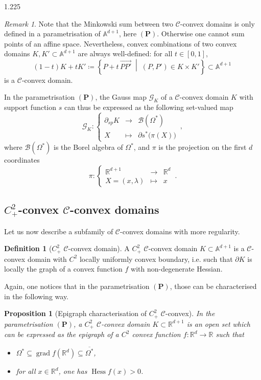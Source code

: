 \documentclass[reqno, a4paper]{amsart}
\numberwithin{equation}{section}
\numberwithin{figure}{section}
\newtheorem{proposition}[theorem]{Proposition}
\theoremstyle{definition}
\newtheorem{definition}[theorem]{Definition}
\theoremstyle{remark}
\newtheorem{remark}[theorem]{Remark}
\newcommand{\R}{\mathbb{R}} %
\newcommand{\A}{\mathbb{A}} %
\DeclareMathOperator{\grad}{grad} %
\DeclareMathOperator{\Hess}{Hess} %
\newcommand{\C}{\mathcal{C}} %
\newcommand{\G}{\mathcal{G}} %
\newcommand{\st}{\; \middle\vert \;} %
\newcommand{\namelessfunction}[4]{ \left\lbrace \begin{matrix}
{#1} &\longrightarrow& {#2}\\
{#3} & \longmapsto & {#4}
\end{matrix} \right. }
\newcommand{\function}[5]{{#1}: \namelessfunction{#2}{#3}{#4}{#5}}
\newcommand{\bp}[1]{{\bigl( {#1} \bigr)}} %
\begin{document}
\begin{spacing}{1.225}
\begin{remark}
\label{rem convex combination}
Note that the Minkowski sum between two $\C$-convex domains is only defined in a parametrisation of $\A^{d+1}$, here $(\mathbf{P})$. Otherwise one cannot sum points of an affine space. Nevertheless, convex combinations of two convex domains $K,K' \subset \A^{d+1}$ are always well-defined: for all $t\in [0,1]$,
\begin{equation*}
 (1-t)K+tK'\coloneqq \left\lbrace P+t \, \overrightarrow{PP'} \st (P,P')\in K\times K' \right\rbrace \subset \A^{d+1} \, 
\end{equation*}
is a $\C$-convex domain.
\end{remark}

In the parametrisation $(\mathbf{P})$, the Gauss map $\G_K$ of a $\C$-convex domain $K$ with support function $s$ can thus be expressed as the following set-valued map
\begin{equation*}
\label{eq gauss map def}
\function{\G_{K}}{\partial_{sp} K}{\mathcal{B}(\Omega^*)}{X}{\partial s^*\bp{\pi(X)}} \, ,
\end{equation*}
where $\mathcal{B}(\Omega^*)$ is the Borel algebra of $\Omega^*$, and $\pi$ is the projection on the first $d$ coordinates
\begin{equation*}
 \function{\pi}{\R^{d+1}}{\R^{d}}{X=(x,\lambda)}{x} \, . 
\end{equation*}

\subsection{\texorpdfstring{$C^2_+$-convex $\C$-convex domains}{C2+ C-convex domains}}

Let us now describe a subfamily of $\C$-convex domains with more regularity.

\begin{definition}[$C^2_+$ $\C$-convex domain]
\label{def C2+}
A $C^2_+$ $\C$-convex domain $K \subset \A^{d+1}$ is a $\C$-convex domain with $C^2$ locally uniformly convex boundary, i.e. such that $\partial K$ is locally the graph of a convex function $f$ with non-degenerate Hessian.
\end{definition}

Again, one notices that in the parametrisation $(\mathbf{P})$, those can be characterised in the following way.

\begin{proposition}[Epigraph characterisation of $C^2_+$ $\C$-convex]
\label{prop C2+}
In the parametrisation $(\mathbf{P})$, a $C^2_+$ $\C$-convex domain $K \subset \R^{d+1}$ is an open set which can be expressed as the epigraph of a $C^2$ convex function $f: \R^d\to\R$ such that 
\begin{itemize}
 \item \label{point1 def C2+} $\Omega^* \subseteq \grad f (\R^d) \subseteq \overline{\Omega^*}$,
 \item \label{point2 def C2+} for all $x \in \R^d$, one has $\Hess f(x) >0$. 
\end{itemize}


\end{proposition}
\end{spacing}
\end{document}
